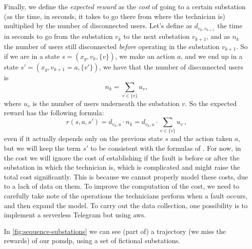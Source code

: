Finally, we define the \emph{expected reward} as the \emph{cost} of going to a certain substation (as the time, in seconds, it takes to go there from where the technician is) multiplied by the number of disconnected users. Let's define as $d_{v_k, v_{k+1}}$ the time in seconds to go from the substation $v_k$ to the next substation $v_{k+1}$, and as $n_{k}$ the number of users still disconnected \emph{before} operating in the substation $v_{k+1}$. So if we are in a state $s = (x_g, v_k, \{v\})$, we make an action $a$, and we end up in a state $s' = (x_g, v_{k+1} = a, \{v'\})$, we have that the number of disconnected users is
\begin{equation}
    n_{k} = \sum_{v \in \{v\}} u_v,
\end{equation}
where $u_v$ is the number of users underneath the substation $v$. So the expected reward has the following formula:
\begin{equation}
    r(s, a, s') = d_{v_k, a} \cdot n_{k} = d_{v_k, a} \cdot \sum_{v \in \{v\}} u_v \, ,
    \label{eq:expected-reward}
\end{equation}
even if it actually depends only on the previous state $s$ and the action taken $a$, but we will keep the term $s'$ to be consistent with the formulas of \cite{SuttonBarto}.
For now, in the cost we will ignore the cost of establishing if the fault is before or after the substation in which the technician is, which is complicated and might raise the total cost significantly. This is because we cannot properly model these costs, due to a lack of data on them. To improve the computation of the cost, we need to carefully take note of the operations the technicians perform when a fault occurs, and then expand the model. To carry out the data collection, one possibility is to implement a serverless Telegram bot using \acrshort{aws}.

In \autoref{fig:sequence-substations} we can see (part of) a trajectory (we miss the rewards) of our \acrshort{pomdp}, using a set of fictional substations.

